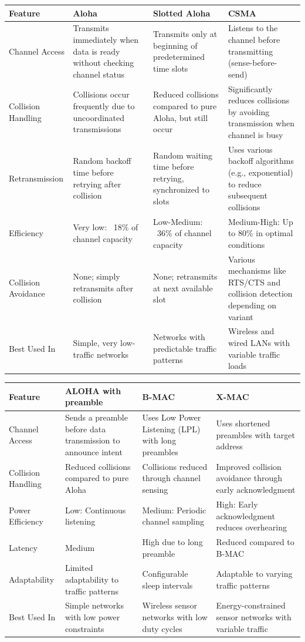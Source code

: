 \documentclass[10pt,landscape]{article}
\newcommand{\1}{\mathmybb{1}}
\begin{document}
  
  \begin{tabular}{|p{2.5cm}|p{3.5cm}|p{3.5cm}|p{3.5cm}|}
  \hline
  \rowcolor[gray]{0.8}
  \textbf{Feature} & \textbf{Aloha} & \textbf{Slotted Aloha} & \textbf{CSMA} \\
  \hline
  Channel Access & Transmits immediately when data is ready without checking channel status & Transmits only at beginning of predetermined time slots & Listens to the channel before transmitting (sense-before-send) \\
  \hline
  Collision Handling & Collisions occur frequently due to uncoordinated transmissions & Reduced collisions compared to pure Aloha, but still occur & Significantly reduces collisions by avoiding transmission when channel is busy \\
  \hline
  Retransmission & Random backoff time before retrying after collision & Random waiting time before retrying, synchronized to slots & Uses various backoff algorithms (e.g., exponential) to reduce subsequent collisions \\
  \hline
  Efficiency & Very low: ~18\% of channel capacity & Low-Medium: ~36\% of channel capacity & Medium-High: Up to 80\% in optimal conditions \\
  \hline
  Collision Avoidance & None; simply retransmits after collision & None; retransmits at next available slot & Various mechanisms like RTS/CTS and collision detection depending on variant \\
  \hline
  Best Used In & Simple, very low-traffic networks & Networks with predictable traffic patterns & Wireless and wired LANs with variable traffic loads \\
  \hline
  \end{tabular}

  
  \begin{tabular}{|p{2.5cm}|p{3.5cm}|p{3.5cm}|p{3.5cm}|}
  \hline
  \rowcolor[gray]{0.8}
  \textbf{Feature} & \textbf{ALOHA with preamble} & \textbf{B-MAC} & \textbf{X-MAC} \\
  \hline
  Channel Access & Sends a preamble before data transmission to announce intent & Uses Low Power Listening (LPL) with long preambles & Uses shortened preambles with target address \\
  \hline
  Collision Handling & Reduced collisions compared to pure Aloha & Collisions reduced through channel sensing & Improved collision avoidance through early acknowledgment \\
  \hline
  Power Efficiency & Low: Continuous listening & Medium: Periodic channel sampling & High: Early acknowledgment reduces overhearing \\
  \hline
  Latency & Medium & High due to long preamble & Reduced compared to B-MAC \\
  \hline
  Adaptability & Limited adaptability to traffic patterns & Configurable sleep intervals & Adaptable to varying traffic patterns \\
  \hline
  Best Used In & Simple networks with low power constraints & Wireless sensor networks with low duty cycles & Energy-constrained sensor networks with variable traffic \\
  \hline
  \end{tabular}
\end{document}
